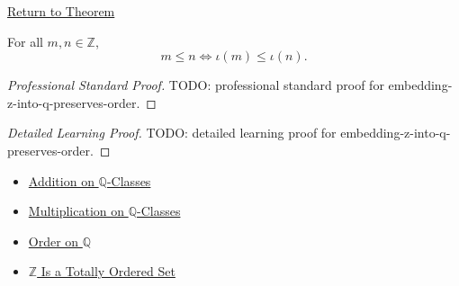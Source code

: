\newpage
{}
\label{prf:embedding-z-into-q-preserves-order}

\begin{remark*}[Return]
\hyperref[thm:embedding-z-into-q-preserves-order]{Return to Theorem}
\end{remark*}

\begin{theorem*}
For all $m,n\in\mathbb{Z}$,
\[
m\le n
\Longleftrightarrow
\iota(m)\le\iota(n).
\]
\end{theorem*}

\begin{proof}[Professional Standard Proof]
\LRAProofBodyStart
TODO: professional standard proof for embedding-z-into-q-preserves-order.
\end{proof}

\begin{proof}[Detailed Learning Proof]
\LRAProofBodyStart
TODO: detailed learning proof for embedding-z-into-q-preserves-order.
\end{proof}

\begin{remark*}
\end{remark*}

\begin{dependencies}
\begin{itemize}
  \item \hyperref[def:addition-on-q-classes]{Addition on $\mathbb{Q}$-Classes}
  \item \hyperref[def:multiplication-on-q-classes]{Multiplication on $\mathbb{Q}$-Classes}
  \item \hyperref[def:order-on-q]{Order on $\mathbb{Q}$}
  \item \hyperref[thm:z-totally-ordered-set]{$\mathbb{Z}$ Is a Totally Ordered Set}
\end{itemize}
\end{dependencies}

\clearpage
